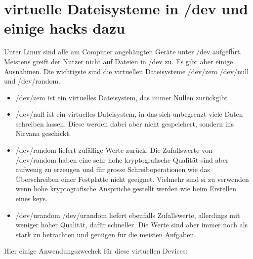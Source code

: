\documentclass[10pt,paper=a4,final]{scrartcl}
\begin{document}
\section{virtuelle Dateisysteme in /dev und einige hacks dazu}
Unter Linux sind alle am Computer angeh\"angten Ger\"ate unter /dev aufgef\"hrt. Meistens greift der Nutzer nicht auf Dateien in /dev zu. Es gibt aber einige Ausnahmen. Die wichtigste sind die virtuellen Dateisysteme /dev/zero /dev/null und /dev/random.\\
\begin{itemize}
\item /dev/zero ist ein virtuelles Dateisystem, das immer Nullen zur\"uckgibt
\item /dev/null ist ein virtuelles Dateisystem, in das sich unbegrenzt viele Daten schreiben lassen. Diese werden dabei aber nicht gespeichert, sondern ins Nirvana geschickt.
\item /dev/random liefert zuf\"allige Werte zur\"uck. Die Zufallswerte von /dev/random haben eine sehr hohe kryptografische Qualit\"at sind aber aufwenig zu erzeugen und f\"ur grosse Schreiboperationen wie das \"Uberschreiben einer Festplatte nicht geeignet. Vielmehr sind si zu verwenden wenn hohe kryptografische Anspr\"uche gestellt werden wie beim Erstellen eines keys.
\item /dev/urandom /dev/urandom liefert ebenfalls Zufallswerte, allerdings mit weniger hoher Qualit\"at, daf\"ur schneller. Die Werte sind aber immer noch als stark zu betrachten und gen\"ugen f\"ur die meisten Aufgaben.
\end{itemize}
Hier einige Anwendungszwechek f\"ur diese virtuellen Devices:
\end{document}

